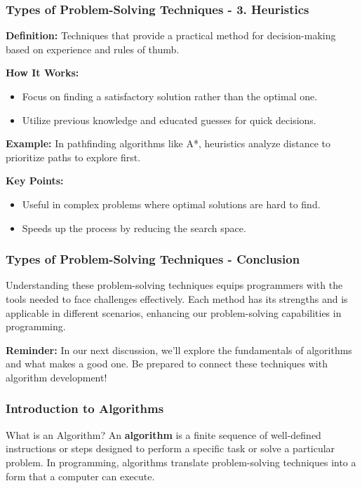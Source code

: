 \documentclass{beamer}
\begin{document}
\begin{frame}[fragile]
    \frametitle{Types of Problem-Solving Techniques - 3. Heuristics}
    \textbf{Definition:} Techniques that provide a practical method for decision-making based on experience and rules of thumb.

    \textbf{How It Works:}
    \begin{itemize}
        \item Focus on finding a satisfactory solution rather than the optimal one.
        \item Utilize previous knowledge and educated guesses for quick decisions.
    \end{itemize}

    \textbf{Example:} In pathfinding algorithms like A*, heuristics analyze distance to prioritize paths to explore first.

    \textbf{Key Points:}
    \begin{itemize}
        \item Useful in complex problems where optimal solutions are hard to find.
        \item Speeds up the process by reducing the search space.
    \end{itemize}
\end{frame}

\begin{frame}[fragile]
    \frametitle{Types of Problem-Solving Techniques - Conclusion}
    Understanding these problem-solving techniques equips programmers with the tools needed to face challenges effectively. Each method has its strengths and is applicable in different scenarios, enhancing our problem-solving capabilities in programming.

    \textbf{Reminder:} In our next discussion, we'll explore the fundamentals of algorithms and what makes a good one. Be prepared to connect these techniques with algorithm development!
\end{frame}

\begin{frame}[fragile]
    \frametitle{Introduction to Algorithms}
    \begin{block}{What is an Algorithm?}
        An \textbf{algorithm} is a finite sequence of well-defined instructions or steps designed to perform a specific task or solve a particular problem. 
        In programming, algorithms translate problem-solving techniques into a form that a computer can execute.
    \end{block}
\end{frame}
\end{document}
